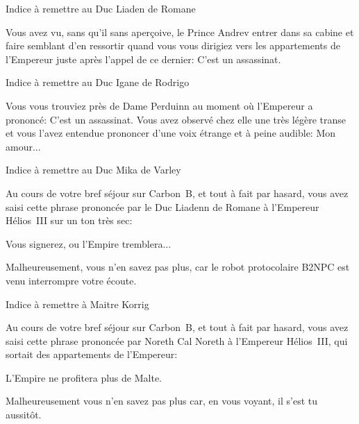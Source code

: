 \documentclass{article}
\begin{document}
\begin{samepage}
    Indice à remettre au Duc Liaden de Romane

    \nobreak

    \begin{framed}
        Vous avez vu, sans qu'il sans aperçoive, le Prince Andrev entrer dans
        sa cabine et faire semblant d'en ressortir quand vous vous dirigiez
        vers les appartements de l'Empereur juste après l'appel de ce dernier:
        \og C'est un assassinat\fg{}.
    \end{framed}
\end{samepage}

\begin{samepage}
    Indice à remettre au Duc Igane de Rodrigo

    \nobreak

    \begin{framed}
        Vous vous trouviez près de Dame Perduinn au moment où l'Empereur a
        prononcé: \og C'est un assassinat\fg{}. Vous avez observé chez elle une
        très légère transe et vous l'avez entendue prononcer d'une voix étrange
        et à peine audible: \og Mon amour...\fg
    \end{framed}
\end{samepage}

\begin{samepage}
    Indice à remettre au Duc Mika de Varley

    \nobreak

    \begin{framed}
        Au cours de votre bref séjour sur Carbon~B, et tout à fait par hasard,
        vous avez saisi cette phrase prononcée par le Duc Liadenn de Romane à
        l'Empereur Hélios~III sur un ton très sec:

        \nobreak

        \og Vous signerez, ou l'Empire tremblera...\fg{}

        \nobreak

        Malheureusement, vous n'en savez pas plus, car le robot protocolaire
        B2NPC est venu interrompre votre écoute.
    \end{framed}
\end{samepage}

\begin{samepage}
    Indice à remettre à Maitre Korrig

    \nobreak

    \begin{framed}
        Au cours de votre bref séjour sur Carbon~B, et tout à fait par hasard,
        vous avez saisi cette phrase prononcée par Noreth Cal Noreth à
        l'Empereur Hélios~III, qui sortait des appartements de l'Empereur:

        \nobreak

        \og L'Empire ne profitera plus de Malte.\fg{}

        \nobreak

        Malheureusement vous n'en savez pas plus car, en vous voyant, il
        s'est tu aussitôt.
    \end{framed}
\end{samepage}
\end{document}
